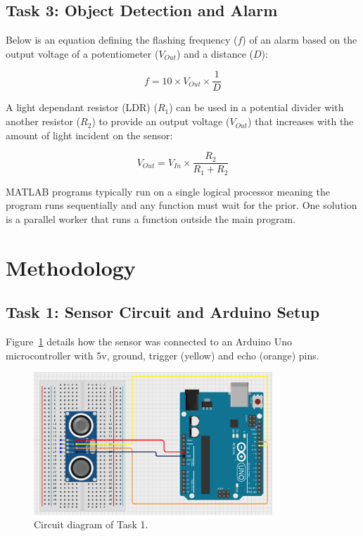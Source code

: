 \documentclass[a4paper,12pt]{article}
\begin{document}
\subsection{Task 3: Object Detection and Alarm}
Below is an equation defining the flashing frequency ($f$) of an alarm based on the output voltage of a potentiometer ($V_{Out}$) and a distance ($D$):

\begin{equation}
\label{alarm}
    f = 10 \times V_{Out} \times \frac{1}{D}
\end{equation}

A light dependant resistor (LDR) ($R_1$) can be used in a potential divider with another resistor ($R_2$) to provide an output voltage ($V_{Out}$) that increases with the amount of light incident on the sensor:

\begin{equation}
\label{ldr}
V_{Out} = V_{In} \times \frac{R_2}{R_1 + R_2}
\end{equation}

MATLAB programs typically run on a single logical processor meaning the program runs sequentially and any function must wait for the prior. One solution is a parallel worker that runs a function outside the main program.





\section{Methodology}
\subsection{Task 1: Sensor Circuit and Arduino Setup}
Figure~\ref{fig:circuit_diagram} details how the sensor was connected to an Arduino Uno microcontroller with 5v, ground, trigger (yellow) and echo (orange) pins.

\begin{figure}[htbp]
    \captionsetup{justification=centering}
    \centering
    \includegraphics[width=0.8\textwidth]{figs/task1_circuit.png}
    \caption{Circuit diagram of Task 1.}
    \label{fig:circuit_diagram}
\end{figure}
\end{document}
